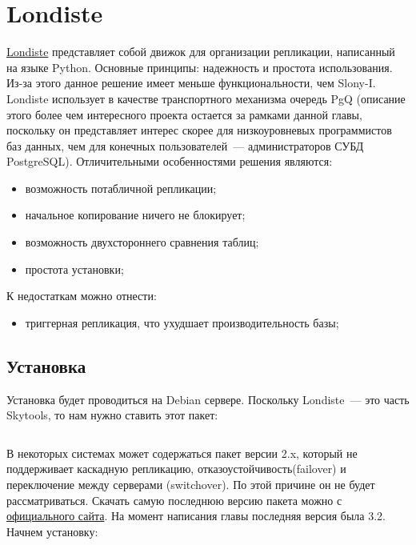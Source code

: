 \section{Londiste}
\label{sec:londiste}

\href{http://pgfoundry.org/projects/skytools}{Londiste} представляет собой движок для организации репликации, написанный на языке Python. Основные принципы: надежность и простота использования. Из-за этого данное решение имеет меньше функциональности, чем Slony-I. Londiste использует в качестве транспортного механизма очередь PgQ (описание этого более чем интересного проекта остается за рамками данной главы, поскольку он представляет интерес скорее для низкоуровневых программистов баз данных, чем для конечных пользователей~--- администраторов СУБД PostgreSQL). Отличительными особенностями решения являются:

\begin{itemize}
  \item возможность потабличной репликации;
  \item начальное копирование ничего не блокирует;
  \item возможность двухстороннего сравнения таблиц;
  \item простота установки;
\end{itemize}

К недостаткам можно отнести:

\begin{itemize}
  \item триггерная репликация, что ухудшает производительность базы;
\end{itemize}


\subsection{Установка}

Установка будет проводиться на Debian сервере. Поскольку Londiste~--- это часть Skytools, то нам нужно ставить этот пакет:

\begin{lstlisting}[label=lst:londiste1,caption=Установка]
% sudo aptitude install skytools
\end{lstlisting}

В некоторых системах может содержаться пакет версии 2.x, который не поддерживает каскадную репликацию, отказоустойчивость(failover) и переключение между серверами (switchover). По этой причине он не будет рассматриваться. Скачать самую последнюю версию пакета можно с \href{http://pgfoundry.org/projects/skytools}{официального сайта}. На момент написания главы последняя версия была 3.2. Начнем установку:

